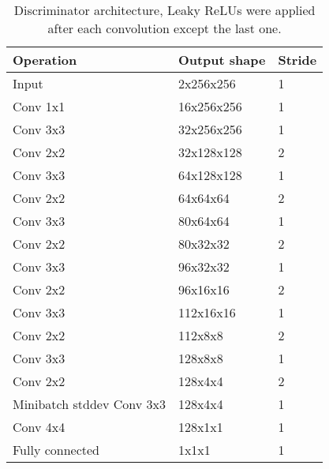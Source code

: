 \begin{table}[t]
    \centering
    \caption{Discriminator architecture, Leaky ReLUs were applied after each convolution except the last one.}
    \label{tab:discriminator}
    \begin{tabular}{|lll|}
        \hline
        Operation          & Output shape     & Stride \\ \hline
        Input              & 2x256x256   & 1   \\
        Conv 1x1           & 16x256x256 & 1    \\ 
        Conv 3x3           & 32x256x256 & 1    \\ 
        Conv 2x2           & 32x128x128 & 2    \\ \hline
        Conv 3x3           & 64x128x128 & 1    \\ 
        Conv 2x2           & 64x64x64 & 2      \\ \hline
        Conv 3x3           & 80x64x64 & 1      \\ 
        Conv 2x2           & 80x32x32 & 2      \\ \hline
        Conv 3x3           & 96x32x32 & 1      \\ 
        Conv 2x2           & 96x16x16 & 2      \\ \hline
        Conv 3x3           & 112x16x16 & 1     \\ 
        Conv 2x2           & 112x8x8 & 2       \\ \hline
        Conv 3x3           & 128x8x8 & 1       \\ 
        Conv 2x2           & 128x4x4 & 2       \\ \hline
        Minibatch stddev
        Conv 3x3           & 128x4x4   & 1     \\
        Conv 4x4           & 128x1x1   & 1     \\ 
        Fully connected    & 1x1x1 & 1         \\ \hline
    \end{tabular}
\end{table}

